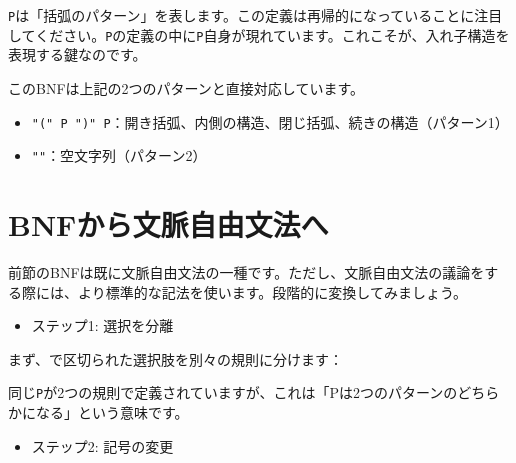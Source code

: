 \texttt{P}は「括弧のパターン」を表します。この定義は再帰的になっていることに注目してください。\texttt{P}の定義の中に\texttt{P}自身が現れています。これこそが、入れ子構造を表現する鍵なのです。

このBNFは上記の2つのパターンと直接対応しています。

\begin{itemize}
\tightlist
\item
  \texttt{"("\ P\ ")"\ P}：開き括弧、内側の構造、閉じ括弧、続きの構造（パターン1）
\item
  \texttt{""}：空文字列（パターン2）
\end{itemize}

\hypertarget{chapter4-bnfux304bux3089ux6587ux8108ux81eaux7531ux6587ux6cd5ux3078}{%
\section{BNFから文脈自由文法へ}\label{chapter4-bnfux304bux3089ux6587ux8108ux81eaux7531ux6587ux6cd5ux3078}}

前節のBNFは既に文脈自由文法の一種です。ただし、文脈自由文法の議論をする際には、より標準的な記法を使います。段階的に変換してみましょう。

\begin{itemize}
\tightlist
\item
  ステップ1: 選択を分離
\end{itemize}

まず、\texttt{\textbar{}}で区切られた選択肢を別々の規則に分けます：

\begin{Shaded}
\begin{Highlighting}[]
\NormalTok{ = }\KeywordTok{;}
\NormalTok{ = }\KeywordTok{;}
\end{Highlighting}
\end{Shaded}

同じ\texttt{P}が2つの規則で定義されていますが、これは「Pは2つのパターンのどちらかになる」という意味です。

\begin{itemize}
\tightlist
\item
  ステップ2: 記号の変更
\end{itemize}

